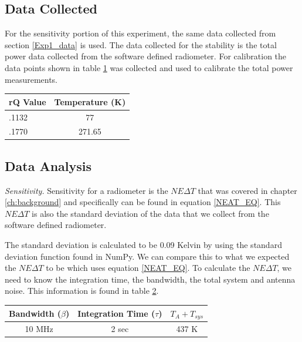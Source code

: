 {\subsection{Data Collected}
For the sensitivity portion of this experiment, the same data collected from section \ref{Exp1_data} is used.  The data collected for the stability is the total power data collected from the software defined radiometer. For calibration the data points shown in table \ref{exp2_datapoints} was collected and used to calibrate the total power measurements.

\begin{table}[h!tb] \centering
{}
\label{exp2_datapoints}
\begin{tabular}{lc} \hline
\textbf{rQ Value} & \textbf{Temperature (K)} \\ \hline
.1132 & 77 \\
.1770 & 271.65 \\ \hline
\end{tabular}
\end{table}
 
\subsection{Data Analysis}

\emph{Sensitivity.}  Sensitivity for a radiometer is the $NE\Delta T$ that was covered in chapter \ref{ch:background} and specifically can be found in equation \ref{NEAT_EQ}.  This $NE\Delta T$ is also the standard deviation of the data that we collect from the software defined radiometer.  

The standard deviation is calculated to be 0.09 Kelvin by using the standard deviation function found in NumPy.  We can compare this to what we expected the $NE\Delta T$ to be which uses equation \ref{NEAT_EQ}.  To calculate the $NE\Delta T$, we need to know the integration time, the bandwidth, the total system and antenna noise.  This information is found in table \ref{exp2_param}.

\begin{table}[h!tb] \centering
{}
\label{exp2_param}
\begin{tabular}{ccc} \hline
\textbf{Bandwidth ($\beta$)} & \textbf{Integration Time ($\tau$)} & \textbf{$T_{A}+T_{sys}$}\\ \hline
10 MHz & 2 sec & 437 K \\ \hline
\end{tabular}
\end{table}

}
